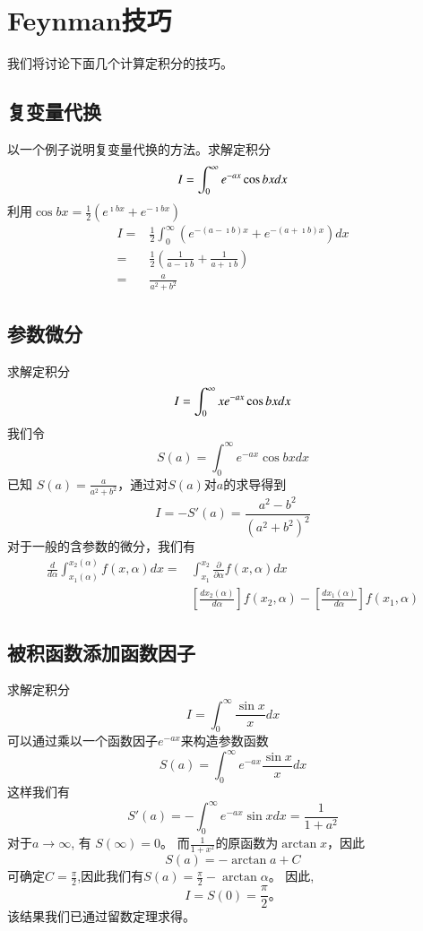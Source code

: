 \section{Feynman技巧}
我们将讨论下面几个计算定积分的技巧。

\subsection{复变量代换}
以一个例子说明复变量代换的方法。求解定积分
\[
    I =  \int_0^{\infty} e^{-a x} \cos b x d x \\
\]
利用$\cos{bx} = \frac{1}{2}\left( e^{\imath b x} + e^{-\imath bx}\right)$
\[    \begin{aligned}
    I= & \frac{1}{2} \int_{0}^{\infty} \left(e^{-(a-\imath b) x} + e^{-(a + \imath b) x} \right)  d x \\
    = & \frac{1}{2} \left( \frac{1}{a-\imath b} +  \frac{1}{a+\imath b} \right)\\
    = & \frac{a}{a^2+b^2}
\end{aligned}
\]

\subsection{参数微分}
求解定积分
\[
    I =  \int_0^{\infty} x e^{-a x} \cos b x d x \\
\]
我们令
\[
  S(a) =   \int_0^{\infty} e^{-a x} \cos b x d x 
\]
已知 $S(a) = \frac{a}{a^2+b^2}$，通过对$S(a)$对$a$的求导得到
\[
    I = - S'(a)  = \frac{a^2 - b^2}{(a^2 +b^2)^2}    
\]
对于一般的含参数的微分，我们有
\begin{equation}
    \begin{aligned}
    \frac{d}{d \alpha} \int_{x_1(\alpha)}^{x_2(\alpha)} f(x, \alpha) d x= & \int_{x_1}^{x_2} \frac{\partial}{\partial \alpha} f(x, \alpha) d x \\
    & \left[\frac{d x_2(\alpha)}{d \alpha} \right] f(x_2, \alpha)- 
    \left[\frac{d x_1(\alpha)}{d \alpha}\right] f(x_1, \alpha)
    \end{aligned}
\end{equation}

\subsection{被积函数添加函数因子}
求解定积分
\[
    I =  \int_0^{\infty} \frac{\sin{x}}{x} d x 
\]
可以通过乘以一个函数因子$e^{-a x}$来构造参数函数
\[
 S(a) =     \int_0^{\infty}  e^{-a x} \frac{\sin{x}}{x} d x 
\]
这样我们有
\[
  S'(a) = -  \int_0^{\infty}  e^{-a x} \sin{x} d x  = \frac{1}{1+a^2}
\]
对于$a \to \infty$, 有 $S(\infty) = 0$。
而$\frac{1}{1+x^2}$的原函数为$\arctan{x}$，因此
\[S(a) = - \arctan{a} + C\]
可确定$C = \frac{\pi}{2}$,因此我们有$S(a) = \frac{\pi}{2} - \arctan{\alpha}$。
因此,
\[
  I = S(0) = \frac{\pi}{2} \textrm{。}    
\]
该结果我们已通过留数定理求得。